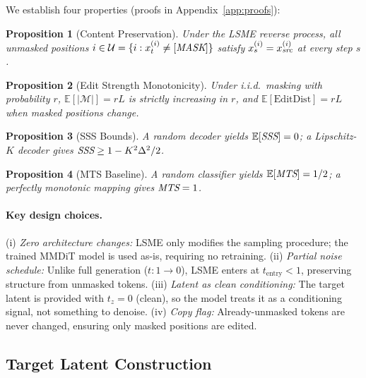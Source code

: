 \documentclass{article}
\newtheorem{proposition}{Proposition}
\begin{document}
We establish four properties (proofs in Appendix~\ref{app:proofs}):

\begin{proposition}[Content Preservation]
\label{prop:copy_flag}
Under the LSME reverse process, all unmasked positions $i \in \mathcal{U} = \{i : x_t^{(i)} \neq [\emph{MASK}]\}$ satisfy $x_s^{(i)} = x_\emph{src}^{(i)}$ at every step $s$.
\end{proposition}

\begin{proposition}[Edit Strength Monotonicity]
\label{prop:edit_strength}
Under i.i.d.\ masking with probability $r$, $\mathbb{E}[|\mathcal{M}|] = rL$ is strictly increasing in $r$, and $\mathbb{E}[\mathrm{EditDist}] = rL$ when masked positions change.
\end{proposition}

\begin{proposition}[SSS Bounds]
\label{prop:sss}
A random decoder yields $\mathbb{E}[\emph{SSS}] = 0$; a Lipschitz-$K$ decoder gives $\emph{SSS} \geq 1 - K^2 \Delta^2/2$.
\end{proposition}

\begin{proposition}[MTS Baseline]
\label{prop:mts}
A random classifier yields $\mathbb{E}[\emph{MTS}] = 1/2$; a perfectly monotonic mapping gives $\emph{MTS} = 1$.
\end{proposition}

\paragraph{Key design choices.}
(i) \emph{Zero architecture changes:} LSME only modifies the sampling procedure; the trained MMDiT model is used as-is, requiring no retraining.
(ii) \emph{Partial noise schedule:} Unlike full generation ($t: 1 \to 0$), LSME enters at $t_\text{entry} < 1$, preserving structure from unmasked tokens.
(iii) \emph{Latent as clean conditioning:} The target latent is provided with $t_z = 0$ (clean), so the model treats it as a conditioning signal, not something to denoise.
(iv) \emph{Copy flag:} Already-unmasked tokens are never changed, ensuring only masked positions are edited.

\subsection{Target Latent Construction}
\end{document}
